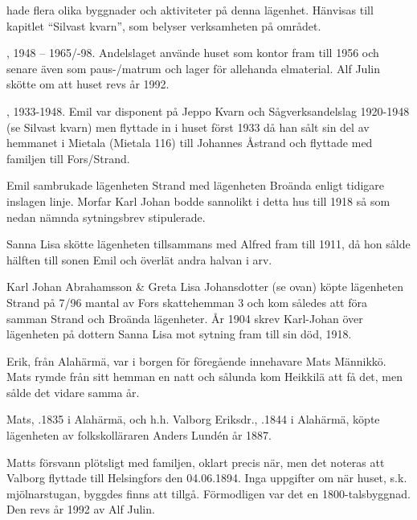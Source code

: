  hade flera olika byggnader och aktiviteter på denna lägenhet. Hänvisas till kapitlet ``Silvast kvarn'', som belyser verksamheten på området.


,
1948 – 1965/-98.
Andelslaget använde huset som kontor fram till 1956 och senare även som paus-/matrum och lager för allehanda elmaterial. Alf Julin skötte om att huset revs år 1992.


,
1933-1948.
Emil var disponent på Jeppo Kvarn och Sågverksandelslag 1920-1948 (se Silvast kvarn) men flyttade in i huset först 1933 då han sålt sin del av hemmanet i Mietala (Mietala 116) till Johannes Åstrand och flyttade med familjen till Fors/Strand.


Emil sambrukade lägenheten Strand med lägenheten Broända enligt tidigare inslagen linje. Morfar Karl Johan bodde sannolikt i detta hus till 1918 så som nedan nämnda sytningsbrev stipulerade.


Sanna Lisa skötte lägenheten tillsammans med Alfred fram till 1911,	då hon sålde hälften till sonen Emil och överlät andra halvan i arv.\jhvspace{}


Karl Johan Abrahamsson \& Greta Lisa Johansdotter (se ovan) köpte lägenheten Strand på 7/96 mantal av Fors skattehemman 3 och kom således att föra samman Strand och Broända lägenheter. År 1904 skrev Karl-Johan över lägenheten på dottern Sanna Lisa mot sytning fram till sin död, 1918.


Erik, från Alahärmä, var i borgen för föregående innehavare Mats Männikkö. Mats rymde från sitt hemman en natt och sålunda kom Heikkilä att få det, men sålde det vidare samma år.


Mats, .1835 i Alahärmä, och h.h. Valborg Eriksdr., .1844 i Alahärmä, köpte lägenheten av folkskolläraren Anders Lundén år 1887.
\begin{jhchildren}
  \item {}
  \item {}
  \item {}
  \item {}
  \item {}
\end{jhchildren}
Matts försvann plötsligt med familjen, oklart precis när, men det noteras att Valborg flyttade till Helsingfors den 04.06.1894. Inga uppgifter om när huset, s.k. mjölnarstugan, byggdes finns att tillgå. Förmodligen var det en 1800-talsbyggnad. Den revs år 1992 av Alf Julin.


